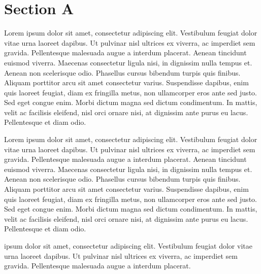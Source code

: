 \documentclass{article}
\begin{document}
\section{Section A}

\beginnumbering
\pstart
Lorem ipsum dolor sit amet, consectetur adipiscing elit. Vestibulum feugiat dolor vitae urna laoreet dapibus. Ut pulvinar nisl ultrices ex viverra, ac imperdiet sem gravida. Pellentesque malesuada augue a interdum placerat. Aenean tincidunt euismod viverra. Maecenas consectetur ligula nisi, in dignissim nulla tempus et. Aenean non scelerisque odio. Phasellus cursus bibendum turpis quis finibus. Aliquam porttitor arcu sit amet consectetur varius. Suspendisse dapibus, enim quis laoreet feugiat, diam ex fringilla metus, non ullamcorper eros ante sed justo. Sed eget congue enim. Morbi dictum magna sed dictum condimentum. In mattis, velit ac facilisis eleifend, nisl orci ornare nisi, at dignissim ante purus eu lacus. Pellentesque et diam odio.
\pend
\pausenumbering

\begin{pairs}
\begin{Leftside}
\resumenumbering
\pstart
Lorem ipsum dolor sit amet, consectetur adipiscing elit. Vestibulum feugiat dolor vitae urna laoreet dapibus. Ut pulvinar nisl ultrices ex viverra, ac imperdiet sem gravida. Pellentesque malesuada augue a interdum placerat. Aenean tincidunt euismod viverra. Maecenas consectetur ligula nisi, in dignissim nulla tempus et. Aenean non scelerisque odio. Phasellus cursus bibendum turpis quis finibus. Aliquam porttitor arcu sit amet consectetur varius. Suspendisse dapibus, enim quis laoreet feugiat, diam ex fringilla metus, non ullamcorper eros ante sed justo. Sed eget congue enim. Morbi dictum magna sed dictum condimentum. In mattis, velit ac facilisis eleifend, nisl orci ornare nisi, at dignissim ante purus eu lacus. Pellentesque et diam odio.
\pend
\pausenumbering
\end{Leftside}

\begin{Rightside}
\beginnumbering
\pstart
{} ipsum dolor sit amet, consectetur adipiscing elit. Vestibulum feugiat dolor vitae urna laoreet dapibus. Ut pulvinar nisl ultrices ex viverra, ac imperdiet sem gravida. Pellentesque malesuada augue a interdum placerat.
\pend
\endnumbering
\end{Rightside}
\end{pairs}
\Columns
\end{document}
